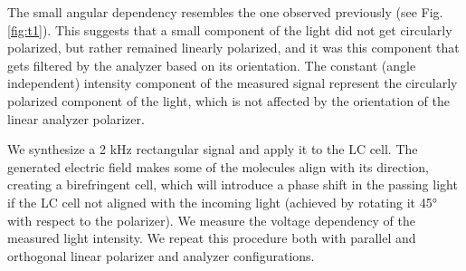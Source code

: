 \documentclass[12pt,a4paper]{article}
\begin{document}
 The small angular dependency resembles the one observed previously (see Fig. \ref{fig:t1}). This suggests that a small component of the light did not get circularly polarized, but rather remained linearly polarized, and it was this component that gets filtered by the analyzer based on its orientation.
 The constant (angle independent) intensity component of the measured signal represent the circularly polarized component of the light, which is not affected by the orientation of the linear analyzer polarizer.



We synthesize a 2 kHz rectangular signal and apply it to the LC cell. The generated electric field makes some of the molecules align with its direction, creating a birefringent cell, which will introduce a phase shift in the passing light if the LC cell not aligned with the incoming light (achieved by rotating it 45° with respect to the polarizer). We measure the voltage dependency of the measured light intensity. We repeat this procedure both with parallel and orthogonal linear polarizer and analyzer configurations.
\end{document}
